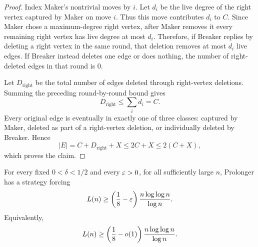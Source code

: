 \begin{proof}
Index Maker's nontrivial moves by $i$.  Let $d_i$ be the live degree of the
right vertex captured by Maker on move $i$.  Thus this move contributes $d_i$
to $C$.  Since Maker chose a maximum-degree right vertex, after Maker removes
it every remaining right vertex has live degree at most $d_i$.  Therefore, if
Breaker replies by deleting a right vertex in the same round, that deletion
removes at most $d_i$ live edges.  If Breaker instead deletes one edge or does
nothing, the number of right-deleted edges in that round is $0$.

Let $D_{\mathrm{right}}$ be the total number of edges deleted through
right-vertex deletions.  Summing the preceding round-by-round bound gives
\[
  D_{\mathrm{right}}\le \sum_i d_i=C.
\]
Every original edge is eventually in exactly one of three classes: captured by
Maker, deleted as part of a right-vertex deletion, or individually deleted by
Breaker.  Hence
\[
  |E|=C+D_{\mathrm{right}}+X\le 2C+X\le 2(C+X),
\]
which proves the claim.
\end{proof}

\begin{theorem}\label{thm:fan-lower-bound}
For every fixed $0<\delta<1/2$ and every $\varepsilon>0$, for all sufficiently large
$n$, Prolonger has a strategy forcing
\[
  L(n)\ge
  \left(\frac18-\varepsilon\right)\frac{n\log\log n}{\log n}.
\]
Equivalently,
\[
  L(n)\ge
  \left(\frac18-o(1)\right)\frac{n\log\log n}{\log n}.
\]
\end{theorem}

